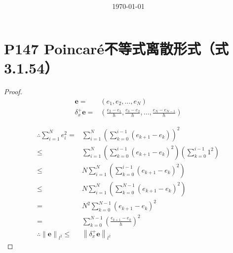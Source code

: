 \documentclass{article}%
\title{\heiti \myArticleName \\ [2ex] \begin{large} \myHomeworkNumber \end{large}}
\author{\kaishu \myName \myNumber}
\date{\today}
\begin{document}
\maketitle


\section{P147 Poincar\'{e}不等式离散形式（式3.1.54）}

\begin{proof}
\begin{align*}
	\mathbf{e}=&\left ( e_1,e_2,\dots ,e_N \right )\\
	\delta ^+_x \mathbf{e}=&\left ( \frac{e_2-e_1}{h},\frac{e_3-e_2}{h},\dots ,\frac{e_N-e_{N-1}}{h} \right )
\end{align*}

\begin{align*}
\therefore \sum_{i=1}^{N}e^2_i = & \sum_{i=1}^{N}\left (\sum_{k=0}^{i-1}\left (e_{k+1}-e_k  \right )  \right )^2 \\
\leq & \sum_{i=1}^{N}\left (\sum_{k=0}^{i-1}\left (e_{k+1}-e_k  \right )^2  \right ) \left (\sum_{k=0}^{i-1} 1^2  \right )  \\
\leq & N \sum_{i=1}^{N}\left (\sum_{k=0}^{i-1}\left (e_{k+1}-e_k  \right )^2  \right ) \\
\leq & N \sum_{i=1}^{N}\left (\sum_{k=0}^{N-1}\left (e_{k+1}-e_k  \right )^2  \right ) \\
= &  N^2 \sum_{k=0}^{N-1}\left (e_{k+1}-e_k  \right )^2   \\
= &   \sum_{k=0}^{N-1} \left ( \frac{e_{k+1}-e_k}{h} \right )^2  \\
\therefore \left \| \mathbf{e}  \right \|_{\mathit{l}^2} \leq & \left \| \delta ^+_x \mathbf{e}  \right \|_{\mathit{l}^2}
\end{align*}
\end{proof}
\end{document}
